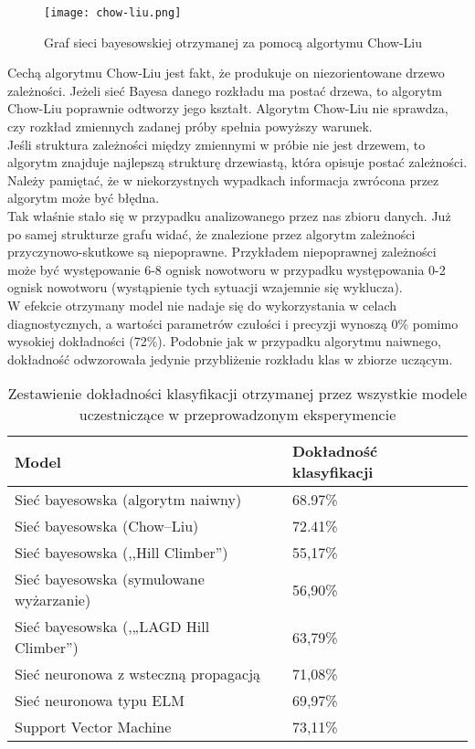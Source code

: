 \begin{figure}[H]
	\centering
	\texttt{[image: chow-liu.png]}
	\label{hc}
	\caption{Graf sieci bayesowskiej otrzymanej za pomocą algortymu Chow-Liu}
\end{figure}

Cechą algorytmu Chow-Liu jest fakt, że produkuje on niezorientowane drzewo zależności. Jeżeli sieć Bayesa danego rozkładu ma postać drzewa, to algorytm Chow-Liu poprawnie odtworzy jego kształt. Algorytm Chow-Liu nie sprawdza, czy rozkład zmiennych zadanej próby spełnia powyższy warunek. \\
Jeśli struktura zależności między zmiennymi w próbie nie jest drzewem, to algorytm znajduje najlepszą strukturę drzewiastą, która opisuje postać zależności. Należy pamiętać, że w  niekorzystnych wypadkach informacja zwrócona przez algorytm może być błędna. \\
Tak właśnie stało się w przypadku  analizowanego przez nas zbioru danych. Już po samej strukturze grafu widać, że znalezione przez algorytm zależności przyczynowo-skutkowe są niepoprawne. Przykładem niepoprawnej zależności może być  występowanie 6-8 ognisk nowotworu w przypadku występowania 0-2 ognisk nowotworu (wystąpienie tych sytuacji wzajemnie się wyklucza). \\
W efekcie otrzymany model nie nadaje się do wykorzystania w celach diagnostycznych, a wartości parametrów czułości i precyzji wynoszą 0\% pomimo wysokiej dokładności (72\%). Podobnie jak w przypadku algorytmu naiwnego, dokładność odwzorowała jedynie przybliżenie rozkładu klas w zbiorze uczącym.


\begin{table}[H]
\centering
\caption{Zestawienie dokładności klasyfikacji otrzymanej przez wszystkie modele uczestniczące w przeprowadzonym eksperymencie}
\label{last}
\begin{tabular}{|l|l|}
\hline
\rowcolor[HTML]{C0C0C0} 
{\color[HTML]{333333} Model}            & {\color[HTML]{333333} Dokładność klasyfikacji} \\ \hline
Sieć bayesowska (algorytm naiwny)       & 68.97\%                                        \\ \hline
Sieć bayesowska (Chow–Liu)              & 72.41\%                                        \\ \hline
Sieć bayesowska (,,Hill Climber”)       & 55,17\%                                        \\ \hline
Sieć bayesowska (symulowane wyżarzanie) & 56,90\%                                        \\ \hline
Sieć bayesowska (,„LAGD Hill Climber”)  & 63,79\%                                        \\ \hline
Sieć neuronowa z wsteczną propagacją    & 71,08\%                                        \\ \hline
Sieć neuronowa typu ELM                 & 69,97\%                                        \\ \hline
Support Vector Machine                  & 73,11\%                                        \\ \hline
\end{tabular}
\end{table}

